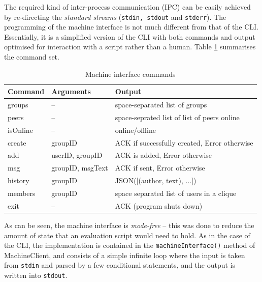 \documentclass[a4paper, 12pt]{report}
\begin{document}
The required kind of inter-process communication (IPC) can be easily achieved by re-directing the \emph{standard streams} (\texttt{stdin, stdout} and \texttt{stderr}). The programming of the machine interface is not much different from that of the CLI. Essentially, it is a simplified version of the CLI with both commands and output optimised for interaction with a script rather than a human. Table \ref{tab:MachineInterface} summarises the command set.

\begin{table}[H]
\centering
\begin{tabular*}{0.95\textwidth}{l | l | l}
    Command & Arguments & Output \\
    \hline
    groups & -- & space-separated list of groups \\
    peers & -- & space-seprated list of list of peers online \\
    isOnline & -- & online/offline \\
    create & groupID & ACK if successfully created, Error otherwise \\
    add & userID, groupID & ACK is added, Error otherwise \\
    msg & groupID, msgText & ACK if sent, Error otherwise \\
    history & groupID & JSON([(author, text), ...]) \\
    members & groupID & space separated list of users in a clique \\
    exit & -- & ACK (program shuts down)
\end{tabular*}
\caption{\label{tab:MachineInterface} Machine interface commands}
\end{table}
As can be seen, the machine interface is \emph{mode-free} -- this was done to reduce the amount of state that an evaluation script would need to hold. As in the case of the CLI, the implementation is contained in the \texttt{machineInterface()} method of MachineClient, and consists of a simple infinite loop where the input is taken from \texttt{stdin} and parsed by a few conditional statements, and the output is written into \texttt{stdout}.
\end{document}
